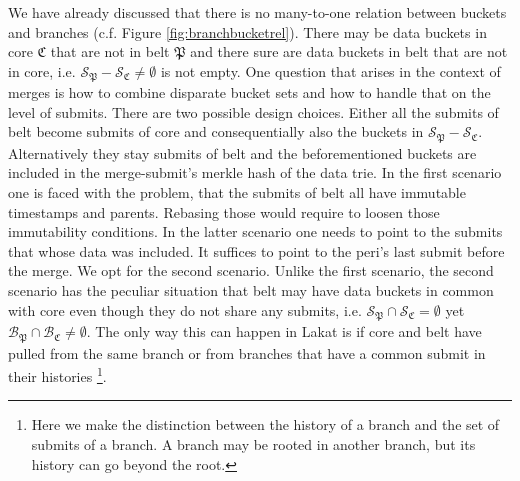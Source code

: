 We have already discussed that there is no many-to-one relation between buckets and branches (c.f. Figure \ref{fig:branchbucketrel}). There may be data buckets in core $\mathfrak C$ that are not in belt $\mathfrak P$ and there sure are data buckets in belt that are not in core, i.e. $\mathcal S_{\mathfrak P}-\mathcal S_{\mathfrak C}\neq \emptyset$ is not empty. 
One question that arises in the context of merges is how to combine disparate bucket sets and how to handle that on the level of submits. There are two possible design choices. Either all the submits of belt become submits of core and consequentially also the buckets in $\mathcal S_{\mathfrak P}-\mathcal S_{\mathfrak C}$. Alternatively they stay submits of belt and the beforementioned buckets are included in the merge-submit's merkle hash of the data trie. In the first scenario one is faced with the problem, that the submits of belt all have immutable timestamps and parents. Rebasing those would require to loosen those immutability conditions. In the latter scenario one needs to point to the submits that whose data was included. It suffices to point to the peri's last submit before the merge. We opt for the second scenario. Unlike the first scenario, the second scenario has the peculiar situation that belt may have data buckets in common with core even though they do not share any submits, i.e. $\mathcal S_{\mathfrak P}\cap\mathcal S_{\mathfrak C}= \emptyset$ yet $\mathcal B_{\mathfrak P}\cap\mathcal B_{\mathfrak C}\neq \emptyset$. The only way this can happen in Lakat is if core and belt have pulled from the same branch or from branches that have a common submit in their histories \footnote{Here we make the distinction between the history of a branch and the set of submits of a branch. A branch may be rooted in another branch, but its history can go beyond the root.}. 

% 
% 
% 
% 
% 
% 



